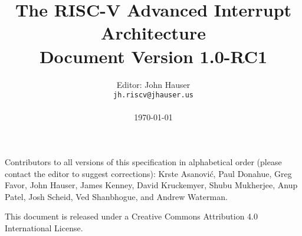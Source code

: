 \documentclass[twoside,11pt]{book}
\newcommand{\AIARev}{1.0-RC1}
\begin{document}

\title{%
  \vspace{-0.7in}%
  {\Large\bf The RISC-V Advanced Interrupt Architecture} \\
  {\large Document Version \AIARev}
  \vspace{-0.1in}%
}

\author{%
  Editor: John Hauser \\
  {\tt jh.riscv\mbox{}@jhauser.us} \\
  \\
  \today
}

\date{}
\maketitle

\thispagestyle{empty}

Contributors to all versions of this specification in alphabetical
order (please contact the editor to suggest corrections):
Krste Asanovi\'{c},
Paul Donahue,
Greg Favor,
John Hauser,
James Kenney,
David Kruckemyer,
Shubu Mukherjee,
Anup Patel,
Josh Scheid,
Ved Shanbhogue,
and Andrew Waterman.

This document is released under a Creative Commons Attribution 4.0
International License.


\frontmatter



{\hypersetup{linktoc=all,hidelinks}
\tableofcontents
}


\mainmatter











\end{document}
